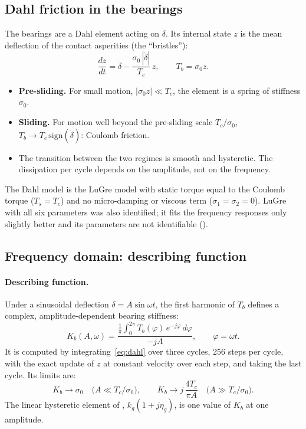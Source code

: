 \subsection{Dahl friction in the bearings}
The bearings are a Dahl element acting on $\delta$. Its internal state $z$ is the mean deflection of the contact asperities (the ``bristles''):
\begin{equation}
\frac{dz}{dt}=\dot\delta-\frac{\sigma_0\,|\dot\delta|}{T_c}\,z,\qquad T_b=\sigma_0 z .\label{eq:dahl}
\end{equation}
\begin{itemize}
\item \textbf{Pre-sliding.} For small motion, $|\sigma_0 z|\ll T_c$, the element is a spring of stiffness $\sigma_0$.
\item \textbf{Sliding.} For motion well beyond the pre-sliding scale $T_c/\sigma_0$, $T_b\to T_c\,\mathrm{sign}(\dot\delta)$: Coulomb friction.
\item The transition between the two regimes is smooth and hysteretic. The dissipation per cycle depends on the amplitude, not on the frequency.
\end{itemize}
The Dahl model is the LuGre model with static torque equal to the Coulomb torque ($T_s=T_c$) and no micro-damping or viscous term ($\sigma_1=\sigma_2=0$). LuGre with all six parameters was also identified; it fits the frequency responses only slightly better and its parameters are not identifiable ().

\subsection{Frequency domain: describing function}\label{sec:df}
\paragraph{Describing function.} Under a sinusoidal deflection $\delta=A\sin\omega t$, the first harmonic of $T_b$ defines a complex, amplitude-dependent bearing stiffness:
\begin{equation}
K_b(A,\omega)=\frac{\frac{1}{\pi}\int_0^{2\pi}T_b(\varphi)\,e^{-j\varphi}\,d\varphi}{-jA},\qquad \varphi=\omega t .\label{eq:df}
\end{equation}
It is computed by integrating~\eqref{eq:dahl} over three cycles, 256 steps per cycle, with the exact update of $z$ at constant velocity over each step, and taking the last cycle. Its limits are:
\begin{equation}
K_b\to\sigma_0\quad\bigl(A\ll T_c/\sigma_0\bigr),\qquad K_b\to j\,\frac{4T_c}{\pi A}\quad\bigl(A\gg T_c/\sigma_0\bigr).
\end{equation}
The linear hysteretic element of , $k_g(1+j\eta_g)$, is one value of $K_b$ at one amplitude.

